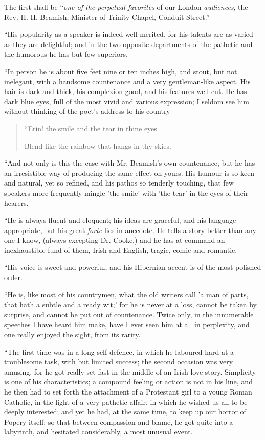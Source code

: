 The first
shall be ``\emph{one of the perpetual favorites} of our London \emph{audiences}, the Rev. H. H. Beamish, Minister of Trinity Chapel, Conduit
Street.''

``His
popularity as a speaker is indeed well merited, for his talents are as
varied as they are delightful; and in the two opposite departments of
the pathetic and the humorous he has but few superiors.

``In
person he is about five feet nine or ten inches high, and stout, but not
inelegant, with a handsome countenance and a very gentleman-like aspect.
His hair is dark and thick, his complexion good, and his features well
cut. He has dark blue eyes, full of the most vivid and various
expression; I seldom see him without thinking of the poet's address to
his country—

\begin{quote}

``Erin!
the smile and the tear in thine eyes

Blend like the
rainbow that hangs in thy skies.

\end{quote}

``And
not only is this the case with Mr. Beamish's own countenance, but he
has an irresistible way of producing the same effect on yours.
His humour is so keen and natural, yet so
refined, and his pathos so tenderly touching, that few speakers more
frequently mingle 'the smile' with 'the tear' in the eyes of their
hearers.

``He
is always fluent and eloquent; his ideas are graceful, and his language
appropriate, but his great \emph{forte} lies in anecdote. He tells a
story better than any one I know, (always excepting Dr. Cooke,) and he
has at command an inexhaustible fund of them, Irish and English, tragic,
comic and romantic.

``His
voice is sweet and powerful, and his Hibernian accent is of the most
polished order.

``He
is, like most of his countrymen, what the old writers call 'a man of
parts, that hath a subtle and a ready wit;' for he is never at a loss,
cannot be taken by surprise, and cannot be put out of countenance. Twice
only, in the innumerable speeches I have heard him make, have I ever
seen him at all in perplexity, and one really enjoyed the sight, from
its rarity.

``The
first time was in a long self-defence, in which he laboured hard at a
troublesome task, with but limited success; the second occasion was very
amusing, for he got really set fast in the middle of an Irish love
story. Simplicity is one of his characteristics; a compound feeling or
action is not in his line, and he then had to set forth the attachment
of a Protestant girl to a young Roman Catholic, in the light of a very
pathetic affair, in which he wished us all to be deeply interested; and
yet he had, at the same time, to keep up our horror of Popery itself; so
that between compassion and blame, he got quite into a labyrinth, and
hesitated considerably, a most unusual event.

